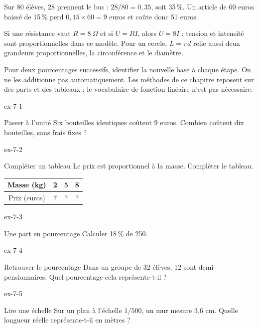 \begin{exemple}Sur 80 élèves, 28 prennent le bus : $28/80=0{,}35$, soit 35\,\%. Un article de 60 euros baissé de 15\,\% perd $0{,}15\times60=9$ euros et coûte donc 51 euros.\end{exemple}
\begin{savoirfaire}Si une résistance vaut $R=8\ \Omega$ et si $U=RI$, alors $U=8I$ : tension et intensité sont proportionnelles dans ce modèle. Pour un cercle, $L=\pi d$ relie aussi deux grandeurs proportionnelles, la circonférence et le diamètre.\end{savoirfaire}
\begin{attention}Pour deux pourcentages successifs, identifier la nouvelle base à chaque étape. On ne les additionne pas automatiquement. Les méthodes de ce chapitre reposent sur des parts et des tableaux ; le vocabulaire de fonction linéaire n’est pas nécessaire.\end{attention}

\clearpage{}
\begin{blocLivre}{ex-7-1}\begin{exercice}[1]{Passer à l’unité}
Six bouteilles identiques coûtent 9 euros. Combien coûtent dix bouteilles, sans frais fixes ?
\end{exercice}\end{blocLivre}
\begin{blocLivre}{ex-7-2}\begin{exercice}[1]{Compléter un tableau}
Le prix est proportionnel à la masse. Compléter le tableau.\begin{center}\renewcommand{\arraystretch}{1.35}\begin{tabular}{c|ccc}\toprule
Masse (kg) & 2 & 5 & 8\\\midrule
Prix (euros) & 7 & ? & ?\\
\bottomrule\end{tabular}\end{center}
\end{exercice}\end{blocLivre}
\begin{blocLivre}{ex-7-3}\begin{exercice}[1]{Une part en pourcentage}
Calculer 18\,\% de 250.
\end{exercice}\end{blocLivre}
\begin{blocLivre}{ex-7-4}\begin{exercice}[1]{Retrouver le pourcentage}
Dans un groupe de 32 élèves, 12 sont demi-pensionnaires. Quel pourcentage cela représente-t-il ?
\end{exercice}\end{blocLivre}
\begin{blocLivre}{ex-7-5}\begin{exercice}[1]{Lire une échelle}
Sur un plan à l’échelle $1/500$, un mur mesure 3,6 cm. Quelle longueur réelle représente-t-il en mètres ?
\end{exercice}\end{blocLivre}

